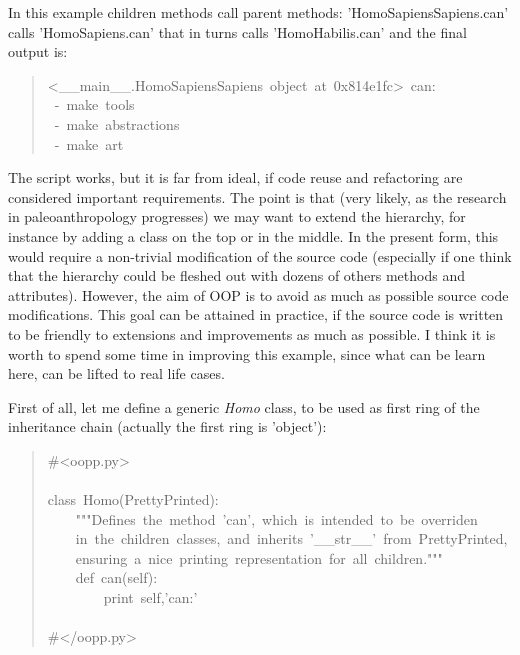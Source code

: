 \documentclass[10pt,english]{article}
\begin{document}
In this example children methods call parent methods:  
'HomoSapiensSapiens.can' calls 'HomoSapiens.can' that in turns calls
'HomoHabilis.can' and the final output is:
\begin{quote}
\begin{ttfamily}\begin{flushleft}
\mbox{<{\_}{\_}main{\_}{\_}.HomoSapiensSapiens~object~at~0x814e1fc>~can:}\\
\mbox{~-~make~tools}\\
\mbox{~-~make~abstractions}\\
\mbox{~-~make~art}
\end{flushleft}\end{ttfamily}
\end{quote}

The script works, but it is far from ideal,  if code reuse and refactoring
are considered important requirements. The point is that (very likely, as the
research in paleoanthropology progresses) we may want to extend the 
hierarchy, for instance by adding a class on the top or in the middle. 
In the present form, this would require a non-trivial modification of 
the source code (especially
if one think that the hierarchy could be fleshed out with dozens of others
methods and attributes). However, the aim of OOP is to avoid as 
much as possible source code modifications. This goal can be attained in
practice, if the source code is written to be friendly to extensions and 
improvements as much as possible. I think it is worth to spend some time 
in improving this example, since what can be learn here, 
can be lifted to real life cases.

First of all, let me define a generic \emph{Homo} class, to be used
as first ring of the inheritance chain (actually the first ring is
'object'):
\begin{quote}
\begin{ttfamily}\begin{flushleft}
\mbox{{\#}<oopp.py>}\\
\mbox{}\\
\mbox{class~Homo(PrettyPrinted):~}\\
\mbox{~~~~"""Defines~the~method~'can',~which~is~intended~to~be~overriden~}\\
\mbox{~~~~in~the~children~classes,~and~inherits~'{\_}{\_}str{\_}{\_}'~from~PrettyPrinted,}\\
\mbox{~~~~ensuring~a~nice~printing~representation~for~all~children."""}\\
\mbox{~~~~def~can(self):~}\\
\mbox{~~~~~~~~print~self,'can:'}\\
\mbox{~~~~}\\
\mbox{{\#}</oopp.py>}
\end{flushleft}\end{ttfamily}
\end{quote}
\end{document}
